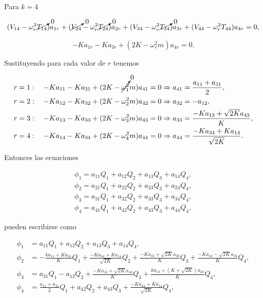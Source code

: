 \documentclass[a4paper,10pt]{article}
\numberwithin{equation}{section}
\begin{document}
Para $k = 4$ 

\begin{equation}
 (V_{14} - \omega_r^2 \cancelto{0}{T_{14}})a_{1r} + (\cancelto{0}{V_{24}} - \omega_r^2 \cancelto{0}{T_{24}})a_{2r} 
  + (V_{34} - \omega_r^2 \cancelto{0}{T_{34}})a_{3r} + (V_{44} - \omega_r^2 T_{44})a_{4r} = 0,
\end{equation}

\begin{equation}
 - Ka_{1r} - Ka_{3r} + (2K - \omega_r^2m)a_{4r} = 0.
\end{equation}

Sustituyendo para cada valor de $r$ tenemos

\begin{align}
 r &= 1: \quad - Ka_{11} - Ka_{31} + (2K - \cancelto{0}{\omega_1^2}m)a_{41} = 0 \Rightarrow 
 a_{41} = \frac{a_{11} + a_{31}}{2}, \\
 r &= 2: \quad - Ka_{12} - Ka_{32} + (2K - \omega_2^2m)a_{42} = 0 \Rightarrow 
 a_{32} = - a_{12}, \\
 r &= 3: \quad - Ka_{13} - Ka_{33} + (2K - \omega_3^2m)a_{43} = 0 \Rightarrow 
 a_{33} = \frac{-Ka_{13} + \sqrt{2K}a_{43}}{K}, \\
 r &= 4: \quad - Ka_{14} - Ka_{34} + (2K - \omega_4^2m)a_{44} = 0 \Rightarrow 
 a_{44} = \frac{-K a_{34} + Ka_{14}}{\sqrt{2K}} .
\end{align}

Entonces las ecuaciones 

\begin{align}
 \phi_1 = a_{11}Q_1 + a_{12}Q_2 + a_{13}Q_3 + a_{14}Q_4, \\
 \phi_2 = a_{21}Q_1 + a_{22}Q_2 + a_{23}Q_3 + a_{24}Q_4, \\
 \phi_3 = a_{31}Q_1 + a_{32}Q_2 + a_{33}Q_3 + a_{34}Q_4, \\
 \phi_4 = a_{41}Q_1 + a_{42}Q_2 + a_{43}Q_3 + a_{44}Q_4,
\end{align}

pueden escribirse como

\begin{align*}
 \phi_1 &= a_{11}Q_1 + a_{12}Q_2 + a_{13}Q_3 + a_{14}Q_4, \\
 \phi_2 &= - \frac{ka_{11} + Ka_{31}}{K}Q_1 + \frac{-K a_{34} + Ka_{14}}{\sqrt{2K}}Q_2 + 
 \frac{- Ka_{43} + \sqrt{2K}a_{33}}{K}Q_3 + \frac{- Ka_{44} - \sqrt{2K}a_{34}}{K}Q_4, \\
 \phi_3 &= a_{31}Q_1 - a_{12}Q_2 + \frac{-Ka_{13} + \sqrt{2K}a_{43}}{K}Q_3 + 
 \frac{ka_{14} + (K + \sqrt{2K})a_{24}}{K}Q_4, \\
 \phi_4 &=  \frac{a_{11} + a_{31}}{2}Q_1 + a_{42}Q_2 + a_{43}Q_3 + 
 \frac{-K a_{34} + Ka_{14}}{\sqrt{2K}}Q_4,
\end{align*}
\end{document}
